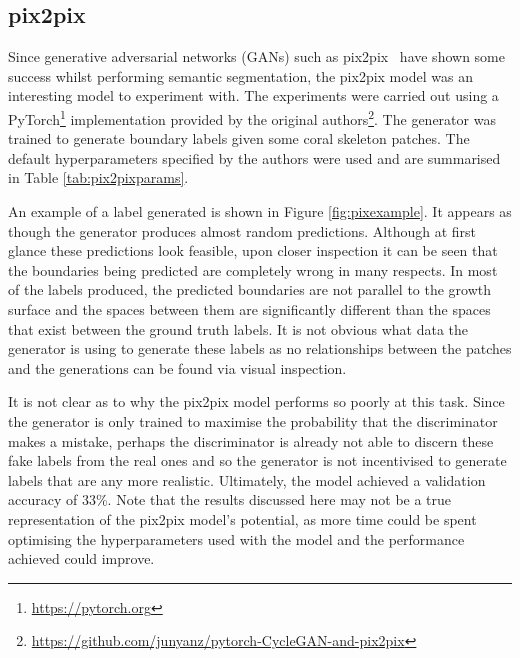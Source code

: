 \subsection{pix2pix}

Since generative adversarial networks (GANs) such as pix2pix~\cite{pix2pix} have shown some success whilst performing semantic segmentation, the pix2pix model was an interesting model to experiment with. The experiments were carried out using a PyTorch\footnote{\url{https://pytorch.org}} implementation provided by the original authors\footnote{\url{https://github.com/junyanz/pytorch-CycleGAN-and-pix2pix}}. The generator was trained to generate boundary labels given some coral skeleton patches. The default hyperparameters specified by the authors were used and are summarised in Table \ref{tab:pix2pixparams}.

An example of a label generated is shown in Figure \ref{fig:pixexample}. It appears as though the generator produces almost random predictions. Although at first glance these predictions look feasible, upon closer inspection it can be seen that the boundaries being predicted are completely wrong in many respects. In most of the labels produced, the predicted boundaries are not parallel to the growth surface and the spaces between them are significantly different than the spaces that exist between the ground truth labels. It is not obvious what data the generator is using to generate these labels as no relationships between the patches and the generations can be found via visual inspection.

It is not clear as to why the pix2pix model performs so poorly at this task. Since the generator is only trained to maximise the probability that the discriminator makes a mistake, perhaps the discriminator is already not able to discern these fake labels from the real ones and so the generator is not incentivised to generate labels that are any more realistic. Ultimately, the model achieved a validation accuracy of 33\%. Note that the results discussed here may not be a true representation of the pix2pix model's potential, as more time could be spent optimising the hyperparameters used with the model and the performance achieved could improve.

